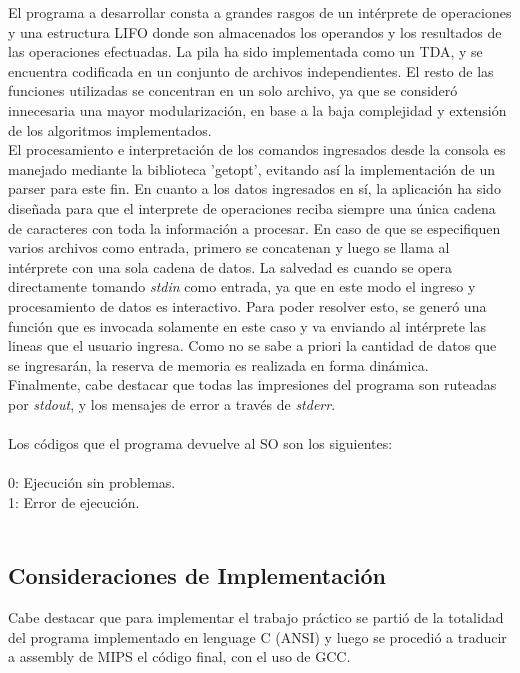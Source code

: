 \documentclass[a4paper,10pt]{article}
\begin{document}
El programa a desarrollar consta a grandes rasgos de un int\'erprete de operaciones y una estructura LIFO donde son almacenados los operandos y los resultados de las operaciones efectuadas. La pila ha sido implementada como un TDA, y se encuentra codificada en un conjunto de archivos independientes. El resto de las funciones utilizadas se concentran en un solo archivo, ya que se consider\'o innecesaria una mayor modularizaci\'on, en base a la baja complejidad y extensi\'on de los algoritmos implementados.\\
El procesamiento e interpretaci\'on de los comandos ingresados desde la consola es manejado mediante la biblioteca 'getopt', evitando as\'i la implementaci\'on de un parser para este fin. En cuanto a los datos ingresados en s\'i, la aplicaci\'on ha sido dise\~nada para que el interprete de operaciones reciba siempre una \'unica cadena de caracteres con toda la informaci\'on a procesar. En caso de que se especifiquen varios archivos como entrada, primero se concatenan y luego se llama al int\'erprete con una sola cadena de datos. La salvedad es cuando se opera directamente tomando \textit{stdin} como entrada, ya que en este modo el ingreso y procesamiento de datos es interactivo. Para poder resolver esto, se gener\'o una funci\'on que es invocada solamente en este caso y va enviando al int\'erprete las lineas que el usuario ingresa. Como no se sabe a priori la cantidad de datos que se ingresar\'an, la reserva de memoria es realizada en forma din\'amica.\\
Finalmente, cabe destacar que todas las impresiones del programa son ruteadas por \textit{stdout}, y los mensajes de error a trav\'es de \textit{stderr}.\\
\\ 
Los c\'odigos que el programa devuelve al SO son los siguientes:\\
\\
0: Ejecuci\'on sin problemas.\\
1: Error de ejecuci\'on.\\
\\

\subsection{Consideraciones de Implementaci\'on}

Cabe destacar que para implementar el trabajo pr\'actico se parti\'o de la totalidad del programa implementado en lenguage C (ANSI) y luego se procedi\'o a traducir a assembly de MIPS el c\'odigo final, con el uso de GCC.
\end{document}
